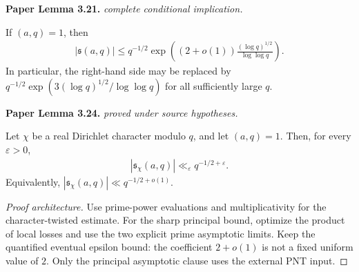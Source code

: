 \begin{lemma}
\label{gauss_bounds}
\leanok
\par\medskip\noindent\textbf{Paper Lemma 3.21.} \textit{complete conditional implication.}\par
If $(a,q)=1$, then
\begin{align}
 |\mathfrak s(a,q)|
 \leq q^{-1/2}
 \exp\left((2+o(1))\frac{(\log q)^{1/2}}{\log\log q}\right).
\end{align}
In particular, the right-hand side may be replaced by
$q^{-1/2}\exp(3(\log q)^{1/2}/\log\log q)$ for all sufficiently large
$q$.
\par\medskip\noindent\textbf{Paper Lemma 3.24.} \textit{proved under source hypotheses.}\par
Let \(\chi\) be a real Dirichlet character modulo \(q\), and let
\((a,q)=1\).  Then, for every \(\varepsilon>0\),
\begin{align}
 |\mathfrak s_\chi(a,q)|\ll_\varepsilon q^{-1/2+\varepsilon}.
\end{align}
Equivalently, \( |\mathfrak s_\chi(a,q)|\ll q^{-1/2+o(1)}\).
\end{lemma}
\begin{proof}[Proof architecture]
\leanok
Use prime-power evaluations and multiplicativity for the character-twisted estimate. For the sharp principal bound, optimize the product of local losses and use the two explicit prime asymptotic limits. Keep the quantified eventual epsilon bound: the coefficient $2+o(1)$ is not a fixed uniform value of $2$. Only the principal asymptotic clause uses the external PNT input.
\end{proof}

